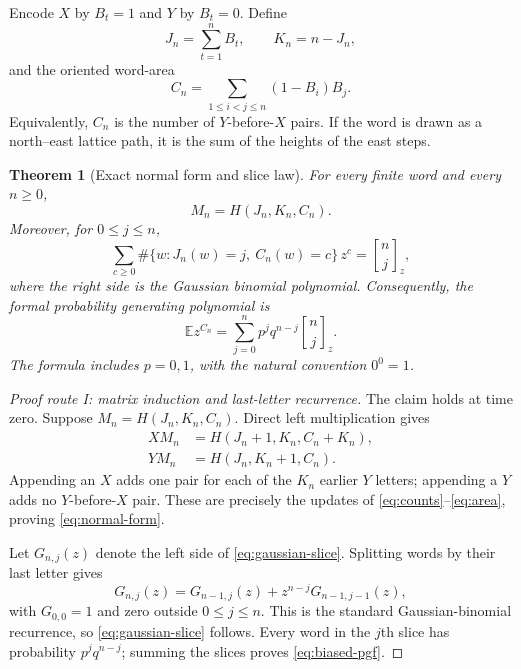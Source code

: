 \documentclass[11pt,a4paper]{amsart}
\newtheorem{theorem}{Theorem}[section]
\theoremstyle{definition}
\theoremstyle{remark}
\newcommand{\Exp}{\mathbb E}
\newcommand{\gauss}[2]{\genfrac{[}{]}{0pt}{}{#1}{#2}_{z}}
\begin{document}
Encode $X$ by $B_t=1$ and $Y$ by $B_t=0$.  Define
\begin{equation}\label{eq:counts}
 J_n=\sum_{t=1}^n B_t,\qquad K_n=n-J_n,
\end{equation}
and the oriented word-area
\begin{equation}\label{eq:area}
 C_n=\sum_{1\leq i<j\leq n}(1-B_i)B_j.
\end{equation}
Equivalently, $C_n$ is the number of $Y$-before-$X$ pairs.  If the word is
drawn as a north--east lattice path, it is the sum of the heights of the
east steps.

\begin{theorem}[Exact normal form and slice law]
\label{thm:normal-law}
For every finite word and every $n\geq0$,
\begin{equation}\label{eq:normal-form}
 \boxed{\quad M_n=H(J_n,K_n,C_n).\quad}
\end{equation}
Moreover, for $0\leq j\leq n$,
\begin{equation}\label{eq:gaussian-slice}
 \sum_{c\geq0}
 \#\{w:J_n(w)=j,\ C_n(w)=c\}\,z^c
 =\gauss{n}{j},
\end{equation}
where the right side is the Gaussian binomial polynomial.  Consequently,
the formal probability generating polynomial is
\begin{equation}\label{eq:biased-pgf}
 \boxed{\quad
 \Exp z^{C_n}=\sum_{j=0}^n p^j q^{n-j}\gauss{n}{j}.
 \quad}
\end{equation}
The formula includes $p=0,1$, with the natural convention $0^0=1$.
\end{theorem}

\begin{proof}[Proof route I: matrix induction and last-letter recurrence]
The claim holds at time zero.  Suppose
$M_n=H(J_n,K_n,C_n)$.  Direct left multiplication gives
\begin{align}
 XM_n&=H(J_n+1,K_n,C_n+K_n),\label{eq:X-update}\\
 YM_n&=H(J_n,K_n+1,C_n).\label{eq:Y-update}
\end{align}
Appending an $X$ adds one pair for each of the $K_n$ earlier $Y$ letters;
appending a $Y$ adds no $Y$-before-$X$ pair.  These are precisely the
updates of \eqref{eq:counts}--\eqref{eq:area}, proving
\eqref{eq:normal-form}.

Let $G_{n,j}(z)$ denote the left side of \eqref{eq:gaussian-slice}.
Splitting words by their last letter gives
\begin{equation}\label{eq:gaussian-recurrence}
 G_{n,j}(z)=G_{n-1,j}(z)+z^{n-j}G_{n-1,j-1}(z),
\end{equation}
with $G_{0,0}=1$ and zero outside $0\leq j\leq n$.  This is the standard
Gaussian-binomial recurrence, so \eqref{eq:gaussian-slice} follows.
Every word in the $j$th slice has probability $p^jq^{n-j}$; summing the
slices proves \eqref{eq:biased-pgf}.
\end{proof}
\end{document}
